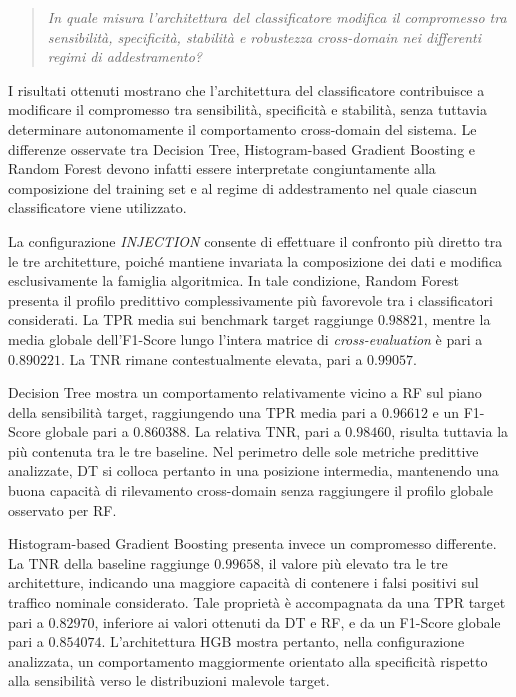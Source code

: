 \begin{quote}
\textit{In quale misura l'architettura del classificatore modifica il compromesso tra sensibilità, specificità, stabilità e robustezza cross-domain nei differenti regimi di addestramento?}
\end{quote}

I risultati ottenuti mostrano che l'architettura del classificatore contribuisce a modificare il compromesso tra sensibilità, specificità e stabilità, senza tuttavia determinare autonomamente il comportamento cross-domain del sistema.
Le differenze osservate tra Decision Tree, Histogram-based Gradient Boosting e Random Forest devono infatti essere interpretate congiuntamente alla composizione del training set e al regime di addestramento nel quale ciascun classificatore viene utilizzato.

La configurazione \textit{INJECTION} consente di effettuare il confronto più diretto tra le tre architetture, poiché mantiene invariata la composizione dei dati e modifica esclusivamente la famiglia algoritmica.
In tale condizione, Random Forest presenta il profilo predittivo complessivamente più favorevole tra i classificatori considerati.
La TPR media sui benchmark target raggiunge $0.98821$, mentre la media globale dell'F1-Score lungo l'intera matrice di \textit{cross-evaluation} è pari a $0.890221$.
La TNR rimane contestualmente elevata, pari a $0.99057$.

Decision Tree mostra un comportamento relativamente vicino a RF sul piano della sensibilità target, raggiungendo una TPR media pari a $0.96612$ e un F1-Score globale pari a $0.860388$.
La relativa TNR, pari a $0.98460$, risulta tuttavia la più contenuta tra le tre baseline.
Nel perimetro delle sole metriche predittive analizzate, DT si colloca pertanto in una posizione intermedia, mantenendo una buona capacità di rilevamento cross-domain senza raggiungere il profilo globale osservato per RF.

Histogram-based Gradient Boosting presenta invece un compromesso differente.
La TNR della baseline raggiunge $0.99658$, il valore più elevato tra le tre architetture, indicando una maggiore capacità di contenere i falsi positivi sul traffico nominale considerato.
Tale proprietà è accompagnata da una TPR target pari a $0.82970$, inferiore ai valori ottenuti da DT e RF, e da un F1-Score globale pari a $0.854074$.
L'architettura HGB mostra pertanto, nella configurazione analizzata, un comportamento maggiormente orientato alla specificità rispetto alla sensibilità verso le distribuzioni malevole target.

